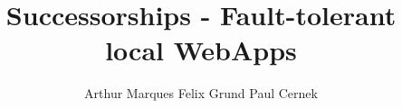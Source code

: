 \documentclass[sigconf]{acmart}
\title{Successorships - Fault-tolerant local WebApps}
\author{Arthur Marques \qquad Felix Grund \qquad Paul Cernek}
\affiliation{
    \institution{University of British Columbia}
    \city{Vancouver} 
    \state{BC} 
  }
\begin{document}
\maketitle

\begin{abstract}

\end{abstract}



















\end{document}
